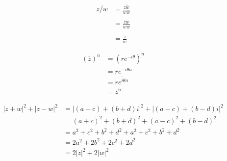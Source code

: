\documentclass[11pt, a4paper, norsk]{NTNUoving}
\begin{document}
\begin{oppgave}
    \begin{punkt}
    \end{punkt}
\end{oppgave}

\begin{oppgave}
    \begin{punkt}
        \begin{align*}
        \overline{z/w} &= \overline{\frac{z\overline{w}}{w\overline{w}}}\\
        \\&= \frac{\overline{z}w}{w\overline{w}}\\
        \\&= \frac{\overline{z}}{\overline{w}}
        \end{align*}
    \end{punkt}
    
    \begin{punkt}
        \begin{align*}
            (\overline{z})^n &= (re^{-i\theta})^n
            \\ &= re^{-i\theta n}
            \\&= \overline{re^{i\theta n}}
            \\&= \overline{z^n}
        \end{align*}
    \end{punkt}
    
    \begin{punkt}
        \begin{align*}
            |z+w|^2 + |z-w|^2 &= |(a+c) + (b+d)i|^2 + |(a-c) + (b-d)i|^2
            \\&= (a+c)^2 + (b+d)^2 + (a-c)^2 + (b-d)^2
            \\&= a^2 + c^2 + b^2 + d^2 + a^2 + c^2 + b^2 + d^2 
            \\&= 2a^2 + 2b^2 + 2c^2 + 2d^2
            \\&= 2|z|^2 + 2|w|^2
        \end{align*}
    \end{punkt}   
    
\end{oppgave}
\end{document}
